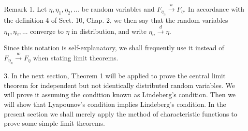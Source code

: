 Remark 1. Let $\eta, \eta_1, \eta_2, \ldots$ be random variables and $F_{\eta_n} \xrightarrow{w} F_{\eta}$. In accordance with the definition 4 of Sect. 10, Chap. 2, we then say that the random variables $\eta_1, \eta_2, \ldots$ converge to $\eta$ in distribution, and write $\eta_n \xrightarrow{d} \eta$.

Since this notation is self-explanatory, we shall frequently use it instead of $F_{\eta_n} \xrightarrow{w} F_{\eta}$ when stating limit theorems.

3. In the next section, Theorem 1 will be applied to prove the central limit theorem for independent but not identically distributed random variables. We will prove it assuming the condition known as Lindeberg’s condition. Then we will show that Lyapounov’s condition implies Lindeberg’s condition. In the present section we shall merely apply the method of characteristic functions to prove some simple limit theorems.

